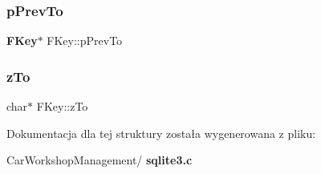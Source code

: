 \mbox{\label{struct_f_key_a56189e420e91df86513e6895db518eca}} 
\subsubsection{pPrevTo}
{\footnotesize\ttfamily \textbf{ F\+Key}$\ast$ F\+Key\+::p\+Prev\+To}

\mbox{\label{struct_f_key_a1eac10bab38a0ac9f88306fbbabbe5d6}} 
\subsubsection{zTo}
{\footnotesize\ttfamily char$\ast$ F\+Key\+::z\+To}



Dokumentacja dla tej struktury została wygenerowana z pliku\+:\begin{DoxyCompactItemize}
\item 
Car\+Workshop\+Management/\textbf{ sqlite3.\+c}\end{DoxyCompactItemize}
